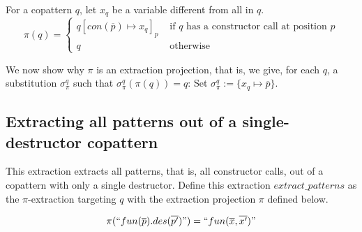 For a copattern $q$, let $x_q$ be a variable different from all in $q$.
\[
\pi(q) = \begin{cases}
             q[con(\overline{p}) \mapsto x_q]_p &\text{ if } q \text{ has a constructor call at position } p \\
             q &\text{ otherwise}
             \end{cases}
\]

We now show why $\pi$ is an extraction projection, that is, we give, for each $q$, a substitution $\sigma^q_\pi$ such that $\sigma^q_\pi(\pi(q)) = q$: Set $\sigma^q_\pi := \{x_q \mapsto \overline{p}\}$.

\subsection{Extracting all patterns out of a single-destructor copattern}

This extraction extracts all patterns, that is, all constructor calls, out of a copattern with only a single destructor. Define this extraction $extract\_patterns$ as the $\pi$-extraction targeting $q$ with the extraction projection $\pi$ defined below.

\[
\pi(`` fun(\overline{p}).des(\overline{p'}) ") = `` fun(\overline{x}, \overline{x'}) "
\]